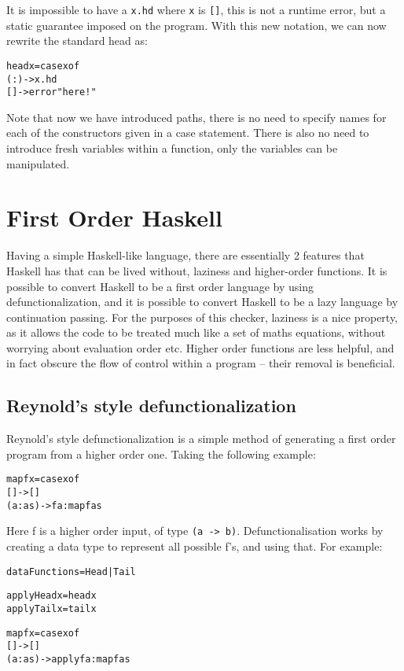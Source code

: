 \documentclass[preprint]{sigplanconf}
\newcommand{\T}[1]{\texttt{#1}}
\begin{document}
It is impossible to have a \T{x.hd} where \T{x} is \T{[]}, this is not a
runtime error, but a static guarantee imposed on the program. With this new
notation, we can now rewrite the standard head as:

\begin{alltt}
 head x = case x of
            (:) -> x.hd
            [] -> error "here!"
\end{alltt}

Note that now we have introduced paths, there is no need to specify names for
each of the constructors given in a case statement. There is also no need to
introduce fresh variables within a function, only the variables can be
manipulated.

\section{First Order Haskell}
\label{chap:defunc}

Having a simple Haskell-like language, there are essentially 2 features that
Haskell has that can be lived without, laziness and higher-order functions. It
is possible to convert Haskell to be a first order language by using
defunctionalization, and it is possible to convert Haskell to be a lazy
language by continuation passing. For the purposes of this checker, laziness is
a nice property, as it allows the code to be treated much like a set of maths
equations, without worrying about evaluation order etc. Higher order functions
are less helpful, and in fact obscure the flow of control within a program --
their removal is beneficial.

\subsection{Reynold's style defunctionalization}

Reynold's style defunctionalization is a simple method of generating a first
order program from a higher order one. Taking the following example:

\begin{alltt}
 map f x = case x of
                [] -> []
                (a:as) -> f a : map f as
\end{alltt}

Here f is a higher order input, of type \T{(a -> b)}. Defunctionalisation works
by creating a data type to represent all possible f's, and using that. For
example:

\begin{alltt}
 data Functions = Head | Tail

 apply Head x = head x
 apply Tail x = tail x

 map f x = case x of
     [] -> []
     (a:as) -> apply f a : map f as
\end{alltt}
\end{document}
